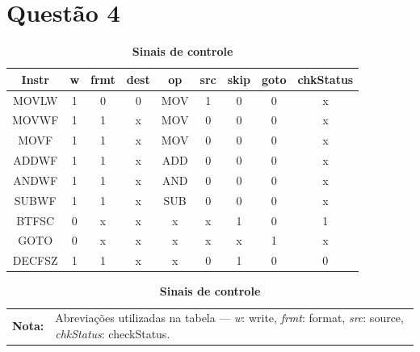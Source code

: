 \documentclass[12pt]{report}
\begin{document}
	\section*{Questão 4}
		\begin{table}[ht]
			\centering
			\caption{\textbf{Sinais de controle}}
			\begin{tabular}{ccccccccc}
				\toprule
				\textbf{Instr} & \textbf{w} & \textbf{frmt} & \textbf{dest} & \textbf{op} & \textbf{src} & \textbf{skip} & \textbf{goto} & \textbf{chkStatus} \\
				\midrule
				MOVLW & 1 & 0 & 0 & MOV & 1 & 0 & 0 & x \\
				MOVWF & 1 & 1 & x & MOV & 0 & 0 & 0 & x \\
				MOVF & 1 & 1 & x & MOV & 0 & 0 & 0 & x \\
				ADDWF & 1 & 1 & x & ADD & 0 & 0 & 0 & x \\
				ANDWF & 1 & 1 & x & AND & 0 & 0 & 0 & x \\
				SUBWF & 1 & 1 & x & SUB & 0 & 0 & 0 & x \\
				BTFSC & 0 & x & x & x & x & 1 & 0 & 1 \\
				GOTO & 0 & x & x & x & x & x & 1 & x \\
				DECFSZ & 1 & 1 & x & x & 0 & 1 & 0 & 0 \\
				\bottomrule
			\end{tabular}\label{tab:Sinais de controle}
			\begin{tabularx}{\textwidth}{l X}
				\textbf{Nota:} & Abreviações utilizadas na tabela --- \textit{w}: write, \textit{frmt}: format, \textit{src}: source, \textit{chkStatus}: checkStatus.
			\end{tabularx}
		\end{table}
\end{document}
